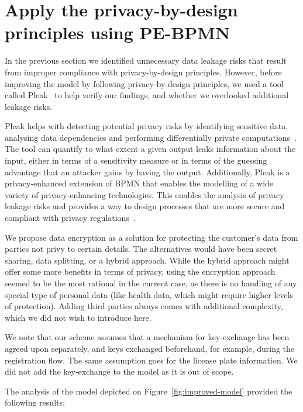 \section{Apply the privacy-by-design principles using PE-BPMN}

In the previous section we identified unnecessary data leakage risks that result
from improper compliance with privacy-by-design principles. However, before
improving the model by following privacy-by-design principles, we used a tool
called Pleak~\cite{pleaktool} to help verify our findings, and whether we
overlooked additional leakage risks.

Pleak helps with detecting potential privacy risks by identifying sensitive
data, analysing data dependencies and performing differentially private
computations~\cite[311-313]{10.1007/978-3-030-16722-6_18}. The tool can quantify
to what extent a given output leaks information about the input, either in terms
of a sensitivity measure or in terms of the guessing advantage that an attacker
gains by having the output. Additionally, Pleak is a privacy-enhanced extension
of BPMN that enables the modelling of a wide variety of privacy-enhancing
technologies. This enables the analysis of privacy leakage risks and provides a
way to design processes that are more secure and compliant with privacy
regulations~\cite[1-3]{10.1007/s10009-021-00636-w}.

We propose data encryption as a solution for protecting the customer's data from
parties not privy to certain details. The alternatives would have been secret
sharing, data splitting, or a hybrid approach. While the hybrid approach might
offer some more benefits in terms of privacy, using the encryption approach
seemed to be the  most rational in the current case, as there is no handling of
any special type of personal data (like health data, which might require higher
levels of protection). Adding third parties always comes with additional
complexity, which we did not wish to introduce here.

We note that our scheme assumes that a mechanism for key-exchange has been
agreed upon separately, and keys exchanged beforehand, for example, during the
registration flow. The same assumption goes for the license plate information.
We did not add the key-exchange to the model as it is out of scope.

\newpage
The analysis of the model depicted on Figure~\ref{fig:improved-model} provided
the following results:

